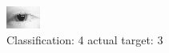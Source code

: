 \begin{figure}[h!]
\begin{center}
\includegraphics[width=0.60\columnwidth]{figures/ID84_class_4_target_3.png}
\end{center}
\caption{ Classification: 4 actual target: 3}
\label{fig:ID84_class_4_target_3}
\end{figure}
